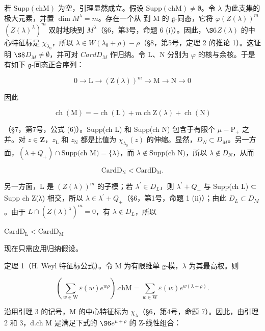 若 \(\mathrm{Supp(chM)}\) 为空，引理显然成立。假设 \(\mathrm{Supp(chM)} \neq \emptyset\)。令 \(\lambda\) 为此支集的极大元素，并置 \(\dim M^{\lambda} = m\)。存在一个从  到 M 的 \(\mathfrak{g}\)-同态，它将 \(\varphi\)\((Z(\lambda))^{m}\)\((Z(\lambda)^{\lambda})^{m}\) 双射地映到 \(M^{\lambda}\)（§6，第3号，命题 6 (i)）。因此，\(\S 6\)\(Z(\lambda)\) 的中心特征标是 \(\chi_{\lambda_0}\)，所以 \(\lambda \in W(\lambda_0 + \rho) - \rho\)（§8，第5号，定理 2 的推论 1）。这证明 \(\S 8\)\(D_M \neq \emptyset\)，并可对 \(CardD_M\) 作归纳。令 L、N 分别为 \(\varphi\) 的核与余核。于是有如下 \(\mathfrak{g}\)-同态正合序列：

\[
0 \to \mathrm{L} \to (\mathrm{Z} (\lambda)) ^ {m} \to \mathrm{M} \to \mathrm{N} \to 0
\]

因此

\[
\operatorname{ch} (\mathrm{M}) = - \operatorname{ch} (\mathrm{L}) + m \operatorname{ch} \mathrm{Z} (\lambda) + \operatorname{ch} (\mathrm{N})
\]

（§7，第7号，公式 (6)）。Supp(ch L) 和 Supp(ch N) 包含于有限个 \(\mu -\mathrm{P}_{+}\) 之并。对 \(z\in \mathbf{Z}\)，\(z_{\mathrm{L}}\) 和 \(z_{\mathrm{N}}\) 都是比值为 \(\chi_{\lambda_{0}}(z)\) 的伸缩。显然，\(D_{N} \subset D_{M}\)。另一方面，\((\lambda + Q_{+}) \cap \text{Supp(ch M)} = \{\lambda\}\)，而 \(\lambda \notin \text{Supp(ch N)}\)，所以 \(\lambda \notin D_{N}\)，从而

\[
\mathrm{Card} \mathrm{D} _ {\mathrm{N}} <   \mathrm{Card} \mathrm{D} _ {\mathrm{M}}.
\]

另一方面，L 是 \((Z(\lambda))^{m}\) 的子模；若 \(\lambda^{\prime} \in D_{L}\)，则 \(\lambda^{\prime} + Q_{+}\) 与 Supp(ch L) ⊂ Supp ch Z(λ) 相交，所以 \(\lambda \in \lambda^{\prime} + Q_{+}\)（§6，第1号，命题 1 (ii)）；由此 \(D_{L} \subset D_{M}\)。由于 \(L \cap (Z(\lambda)^{\lambda})^{m} = 0\)，有 \(\lambda \notin D_{L}\)，所以

\(\mathrm{CardD_L} <   \mathrm{CardD_M}\)

现在只需应用归纳假设。

定理 1（H. Weyl 特征标公式）。令 M 为有限维单 g-模，\(\lambda\) 为其最高权。则

\[
\left(\sum_ {w \in \mathrm{W}} \varepsilon (w) e ^ {w \rho}\right). \mathrm{chM} = \sum_ {w \in \mathrm{W}} \varepsilon (w) e ^ {w (\lambda + \rho)}.
\]

沿用引理 3 的记号，M 的中心特征标为 \(\chi_{\lambda}\)（§6，第4号，命题 7）。因此，由引理 2 和 3，d.ch M 是满足下式的 \(\S6\)\(e^{\mu+\rho}\) 的 Z-线性组合：

